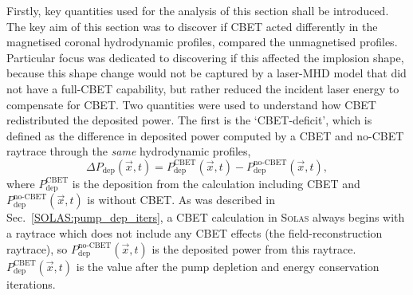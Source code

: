 Firstly, key quantities used for the analysis of this section shall be introduced.
The key aim of this section was to discover if \ac{CBET} acted differently in the magnetised coronal hydrodynamic profiles, compared the unmagnetised profiles.
Particular focus was dedicated to discovering if this affected the implosion shape, because this shape change would not be captured by a laser-\ac{MHD} model that did not have a full-\ac{CBET} capability, but rather reduced the incident laser energy to compensate for \ac{CBET}.
Two quantities were used to understand how \ac{CBET} redistributed the deposited power.
The first is the `\ac{CBET}-deficit', which is defined as the difference in deposited power computed by a \ac{CBET} and no-\ac{CBET} raytrace through the \textit{same} hydrodynamic profiles,
\begin{equation}
    \Delta P_{\text{dep}}(\vec{x},t) = P_{\text{dep}}^{\text{CBET}}(\vec{x},t) - P_{\text{dep}}^{\text{no-CBET}}(\vec{x},t),
\end{equation}
where $P_{\text{dep}}^{\text{CBET}}$ is the deposition from the calculation including \ac{CBET} and $P_{\text{dep}}^{\text{no-CBET}}(\vec{x},t)$ is without \ac{CBET}.
As was described in Sec.~\ref{SOLAS:pump_dep_iters}, a \ac{CBET} calculation in \textsc{Solas} always begins with a raytrace which does not include any \ac{CBET} effects (the field-reconstruction raytrace), so $P_{\text{dep}}^{\text{no-CBET}}(\vec{x},t)$ is the deposited power from this raytrace.
$P_{\text{dep}}^{\text{CBET}}(\vec{x},t)$ is the value after the pump depletion and energy conservation iterations.

